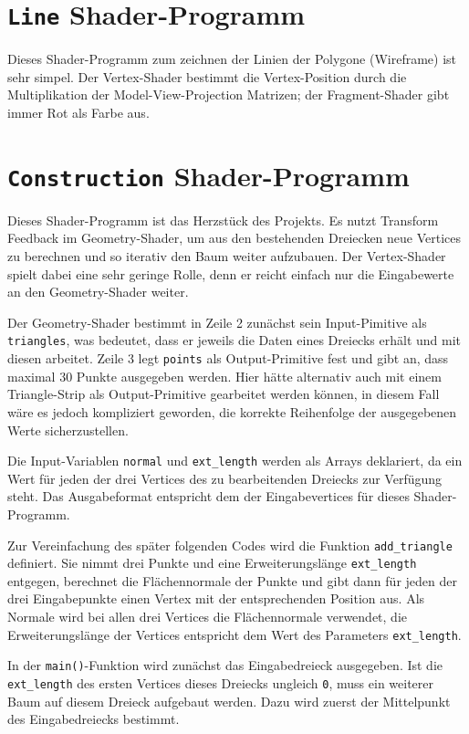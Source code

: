 \section{\lstinline{Line} Shader-Programm}
Dieses Shader-Programm zum zeichnen der Linien der Polygone (Wireframe) ist sehr simpel. Der Vertex-Shader bestimmt die Vertex-Position durch die Multiplikation der Model-View-Projection Matrizen; der Fragment-Shader gibt immer Rot als Farbe aus.

\section{\lstinline{Construction} Shader-Programm}
Dieses Shader-Programm ist das Herzstück des Projekts. Es nutzt Transform Feedback im Geometry-Shader, um aus den bestehenden Dreiecken neue Vertices zu berechnen und so iterativ den Baum weiter aufzubauen. Der Vertex-Shader spielt dabei eine sehr geringe Rolle, denn er reicht einfach nur die Eingabewerte an den Geometry-Shader weiter.

Der Geometry-Shader bestimmt in Zeile 2 zunächst sein Input-Pimitive als \lstinline{triangles}, was bedeutet, dass er jeweils die Daten eines Dreiecks erhält und mit diesen arbeitet. Zeile 3 legt \lstinline{points} als Output-Primitive fest und gibt an, dass maximal 30 Punkte ausgegeben werden. Hier hätte alternativ auch mit einem Triangle-Strip als Output-Primitive gearbeitet werden können, in diesem Fall wäre es jedoch kompliziert geworden, die korrekte Reihenfolge der ausgegebenen Werte sicherzustellen.

Die Input-Variablen \lstinline{normal} und \lstinline{ext_length} werden als Arrays deklariert, da ein Wert für jeden der drei Vertices des zu bearbeitenden Dreiecks zur Verfügung steht. Das Ausgabeformat entspricht dem der Eingabevertices für dieses Shader-Programm. 

Zur Vereinfachung des später folgenden Codes wird die Funktion \lstinline{add_triangle} definiert. Sie nimmt drei Punkte und eine Erweiterungslänge \lstinline{ext_length} entgegen, berechnet die Flächennormale der Punkte und gibt dann für jeden der drei Eingabepunkte einen Vertex mit der entsprechenden Position aus. Als Normale wird bei allen drei Vertices die Flächennormale verwendet, die Erweiterungslänge der Vertices entspricht dem Wert des Parameters \lstinline{ext_length}.

In der \lstinline{main()}-Funktion wird zunächst das Eingabedreieck ausgegeben. Ist die \lstinline{ext_length} des ersten Vertices dieses Dreiecks ungleich \lstinline{0}, muss ein weiterer Baum auf diesem Dreieck aufgebaut werden. Dazu wird zuerst der Mittelpunkt des Eingabedreiecks bestimmt.




